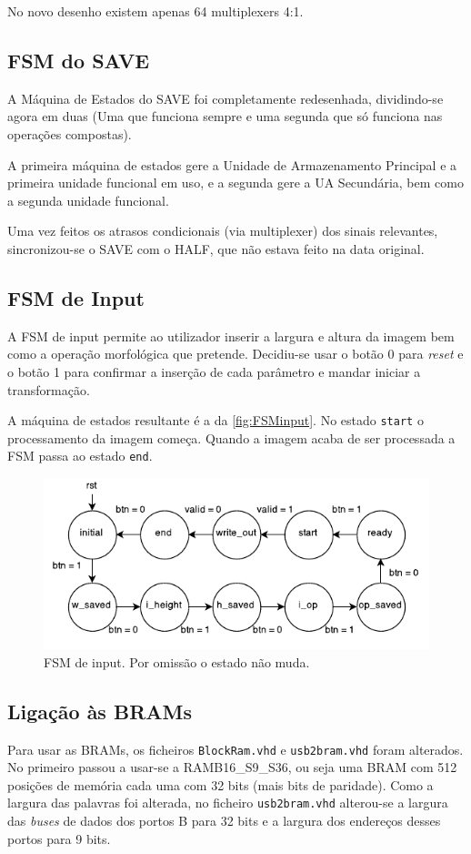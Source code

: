 \documentclass[a4paper]{article}
\begin{document}
No novo desenho existem apenas 64 multiplexers 4:1.


\subsection*{FSM do SAVE}

A Máquina de Estados do SAVE foi completamente redesenhada, dividindo-se agora em duas (Uma que funciona sempre e uma segunda que só funciona nas operações compostas).

A primeira máquina de estados gere a Unidade de Armazenamento Principal e a primeira unidade funcional em uso, e a segunda gere a UA Secundária, bem como a segunda unidade funcional.

Uma vez feitos os atrasos condicionais (via multiplexer) dos sinais relevantes, sincronizou-se o SAVE com o HALF, que não estava feito na data original.

\subsection*{FSM de Input}

A FSM de input permite ao utilizador inserir a largura e altura da imagem bem como a operação morfológica que pretende. Decidiu-se usar o botão 0 para \textit{reset} e o botão 1 para confirmar a inserção de cada parâmetro e mandar iniciar a transformação.

A máquina de estados resultante é a da \autoref{fig:FSMinput}. No estado \texttt{start} o processamento da imagem começa. Quando a imagem acaba de ser processada a FSM passa ao estado \texttt{end}.

\begin{figure}
	\centering
	\includegraphics[width=\textwidth]{controlo_FSM}
	\caption{FSM de input. Por omissão o estado não muda.}
	\label{fig:FSMinput}
\end{figure}

\subsection*{Ligação às BRAMs}
Para usar as BRAMs, os ficheiros \texttt{BlockRam.vhd} e \texttt{usb2bram.vhd} foram alterados. No primeiro passou a usar-se a RAMB16\_S9\_S36, ou seja uma BRAM com 512 posições de memória cada uma com 32 bits (mais bits de paridade). Como a largura das palavras foi alterada, no ficheiro \texttt{usb2bram.vhd} alterou-se a largura das \textit{buses} de dados dos portos B para 32 bits e a largura dos endereços desses portos para 9 bits.
\end{document}
